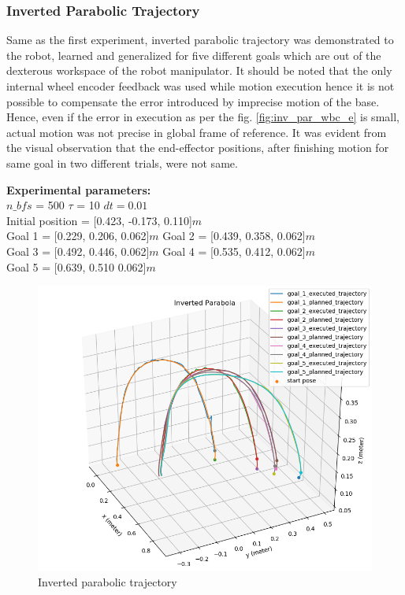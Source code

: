 \subsubsection{Inverted Parabolic Trajectory}

Same as the first experiment, inverted parabolic trajectory was demonstrated to the robot, learned and generalized for five different goals which are out of the dexterous workspace of the robot manipulator. It should be noted that the only internal wheel encoder feedback was used while motion execution hence it is not possible to compensate the error introduced by imprecise motion of the base. Hence, even if the error in execution as per the fig. \ref{fig:inv_par_wbc_e} is small, actual motion was not precise in global frame of reference. It was evident from the visual observation that the end-effector positions, after finishing motion for same goal in two different trials, were not same.  

\textbf{Experimental parameters:} \\
$n\_bfs$ = 500 \hspace{3cm}
$\tau$ = 10 \hspace{3cm}
$dt = 0.01$\\
Initial position = [0.423, -0.173, 0.110]$m$ \\
Goal 1 = [0.229, 0.206, 0.062]$m$ \hspace{2cm}
Goal 2 = [0.439, 0.358, 0.062]$m$\\
Goal 3 = [0.492, 0.446, 0.062]$m$\hspace{2cm}
Goal 4 = [0.535, 0.412, 0.062]$m$\\
Goal 5 = [0.639, 0.510  0.062]$m$

\begin{figure}[H]
	\centering
	\includegraphics[scale=0.6]{images/2/inv_par.png}
	\caption{Inverted parabolic trajectory}
	\label{fig:inv_par_wbc}
\end{figure}


